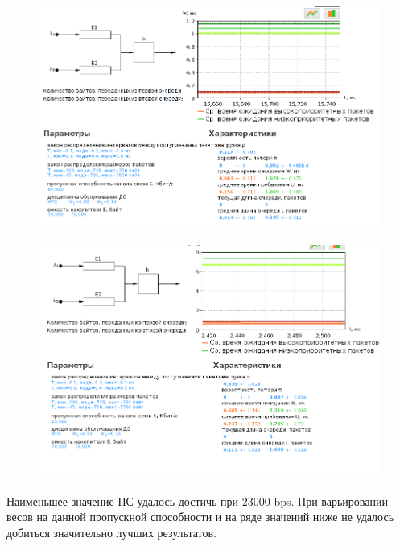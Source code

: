 \documentclass[12pt, a4paper] {ncc}
\begin{document}
		\begin{figure}[h!]
			\includegraphics[scale=0.5]{./img/wfq_50000_70000.png}
		\end{figure}
		\begin{figure}[h!]
			\includegraphics[scale=0.5]{./img/wfq_23000_70000.png}
		\end{figure}
		\newpage	
		Наименьшее значение ПС удалось достичь при 23000 bps. При варьировании весов на данной пропускной способности
		и на ряде значений ниже не удалось добиться значительно лучших результатов.
\end{document}
